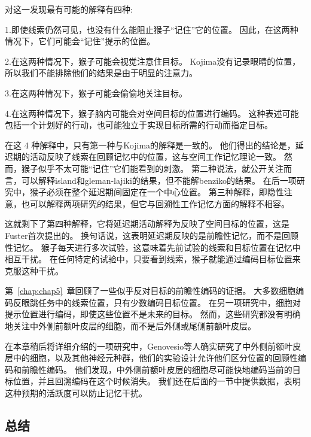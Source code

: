 对这一发现最有可能的解释有四种:
\par


1.即使线索仍然可见，也没有什么能阻止猴子“记住”它的位置。
因此，在这两种情况下，它们可能会“记住”提示的位置。
\par


2.在这两种情况下，猴子可能会视觉注意住目标。
Kojima\cite{kojima1984functional}没有记录眼睛的位置，所以我们不能排除他们的结果是由于明显的注意力。
\par


3.在这两种情况下，猴子可能会偷偷地关注目标。
\par


4.在这两种情况下，猴子脑内可能会对空间目标的位置进行编码。
这种表述可能包括一个计划好的行动，也可能独立于实现目标所需的行动而指定目标。


在这 4 种解释中，只有第一种与Kojima\cite{kojima1984functional}的解释是一致的。
他们得出的结论是，延迟期的活动反映了线索在回顾记忆中的位置，这与空间工作记忆理论一致。
然而，猴子似乎不太可能“记住”它们能看到的刺激。
第二种说法，就公开关注而言，可以解释island和gleman-lajiki的结果，但不能解benziko的结果。
在后一项研究中，猴子必须在整个延迟期间固定在一个中心位置。
第三种解释，即隐性注意，也可以解释两项研究的结果，但它与回溯性工作记忆方面的解释不相容。


这就剩下了第四种解释，它将延迟期活动解释为反映了空间目标的位置，这是Fuster\cite{fuster1973unit}首次提出的。
换句话说，这表明延迟期反映的是前瞻性记忆，而不是回顾性记忆。
猴子每天进行多次试验，这意味着先前试验的线索和目标位置在记忆中相互干扰。
在任何特定的试验中，只要看到线索，猴子就能通过编码目标位置来克服这种干扰。


第~\ref{chap:chap5}~章回顾了一些似乎反对目标的前瞻性编码的证据。
大多数细胞编码反眼跳任务中的线索位置，只有少数编码目标位置。
在另一项研究中，细胞对提示位置进行编码，即使这些位置不是未来的目标。
然而，这些研究都没有明确地关注中外侧前额叶皮层的细胞，而不是后外侧或尾侧前额叶皮层。


在本章稍后将详细介绍的一项研究中，Genovesio等人\cite{genovesio2006representation}确实研究了中外侧前额叶皮层中的细胞，以及其他神经元种群，他们的实验设计允许他们区分位置的回顾性编码和前瞻性编码。
他们发现，中外侧前额叶皮层的细胞尽可能快地编码当前的目标位置，并且回溯编码在这个时候消失。
我们还在后面的一节中提供数据，表明这种预期的活跃度可以防止记忆干扰\cite{sakai2002active}。



\subsection{总结}

